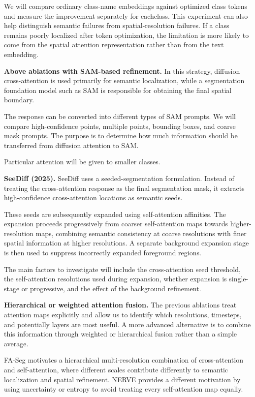 \documentclass[11pt,a4paper]{article}
\begin{document}
We will compare ordinary class-name embeddings against optimized class tokens and
measure the improvement separately for eachclass. This experiment can
also help distinguish semantic failures from spatial-resolution failures. If a class
remains poorly localized after token optimization, the limitation is more likely to
come from the spatial attention representation rather than from the text embedding.

\textbf{Above ablations with SAM-based refinement.}
In this strategy, diffusion cross-attention is used primarily for semantic localization,
while a segmentation foundation model such as SAM is responsible for obtaining the
final spatial boundary.

The response can be converted into different types of SAM prompts. We will
compare high-confidence points, multiple points, bounding boxes, and coarse mask
prompts. The purpose is to determine how much information should be transferred
from diffusion attention to SAM.

Particular attention will be given to smaller classes.

\textbf{SeeDiff (2025).}
SeeDiff uses a seeded-segmentation formulation. Instead of treating the
cross-attention response as the final segmentation mask, it extracts
high-confidence cross-attention locations as semantic seeds.

These seeds are subsequently expanded using self-attention affinities. The
expansion proceeds progressively from coarser self-attention maps towards
higher-resolution maps, combining semantic consistency at coarse resolutions with
finer spatial information at higher resolutions. A separate background expansion
stage is then used to suppress incorrectly expanded foreground regions.

The main factors to investigate will include the cross-attention seed threshold,
the self-attention resolutions used during expansion, whether expansion is
single-stage or progressive, and the effect of the background refinement.

\textbf{Hierarchical or weighted attention fusion.}
The previous ablations treat attention maps explicitly and allow us to identify
which resolutions, timesteps, and potentially layers are most useful. A more
advanced alternative is to combine this information through weighted or
hierarchical fusion rather than a simple average.

FA-Seg motivates a hierarchical multi-resolution combination of cross-attention
and self-attention, where different scales contribute differently to semantic
localization and spatial refinement. NERVE provides a different motivation by
using uncertainty or entropy to avoid treating every self-attention map equally.
\end{document}
